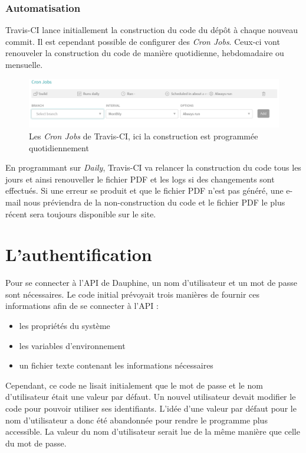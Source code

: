 \subsubsection*{Automatisation}
Travis-CI lance initiallement la construction du code du dépôt à chaque nouveau commit. Il est cependant possible de configurer des \textit{Cron Jobs}. Ceux-ci vont renouveler la construction du code de manière quotidienne, hebdomadaire ou mensuelle. 

\begin{figure}[!ht]
    \begin{center}\includegraphics[width=\textwidth]{assets/CronJobs.PNG}
    \end{center}
    \caption{Les \textit{Cron Jobs} de Travis-CI, ici la construction est programmée quotidiennement}
\end{figure}

En programmant sur \textit{Daily}, Travis-CI va relancer la construction du code tous les jours et ainsi renouveller le fichier PDF et les logs si des changements sont effectués. Si une erreur se produit et que le fichier PDF n'est pas généré, une e-mail nous préviendra de la non-construction du code et le fichier PDF le plus récent sera toujours disponible sur le site.

\section{L'authentification}

Pour se connecter à l'API de Dauphine, un nom d'utilisateur et un mot de passe sont nécessaires. Le code initial prévoyait trois manières de fournir ces informations afin de se connecter à l'API :
\begin{itemize}
    \item les propriétés du système
    \item les variables d'environnement
    \item un fichier texte contenant les informations nécessaires
\end{itemize}

Cependant, ce code ne lisait initialement que le mot de passe et le nom d'utilisateur était une valeur par défaut. Un nouvel utilisateur devait modifier le code pour pouvoir utiliser ses identifiants. L'idée d'une valeur par défaut pour le nom d'utilisateur a donc été abandonnée pour rendre le programme plus accessible. La valeur du nom d'utilisateur serait lue de la même manière que celle du mot de passe.

